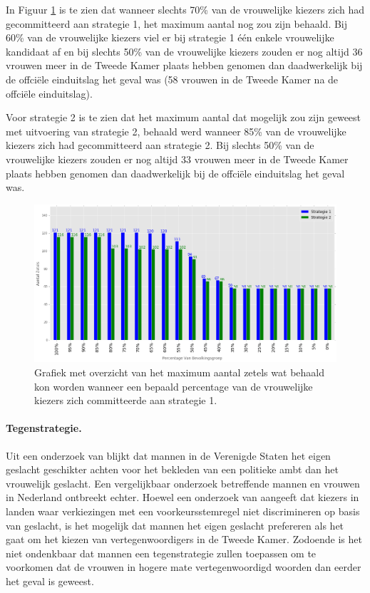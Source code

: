In Figuur \ref{fig:PerV} is te zien dat wanneer slechts 70\% van de vrouwelijke kiezers zich had gecommitteerd aan strategie 1, het maximum aantal nog zou zijn behaald. Bij 60\% van de vrouwelijke kiezers viel er bij strategie 1 één enkele vrouwelijke kandidaat af en bij slechts 50\% van de vrouwelijke kiezers zouden er nog altijd 36 vrouwen meer in de Tweede Kamer plaats hebben genomen dan daadwerkelijk bij de offci\"{e}le einduitslag het geval was (58 vrouwen in de Tweede Kamer na de offci\"{e}le einduitslag). 

Voor strategie 2 is te zien dat het maximum aantal dat mogelijk zou zijn geweest met uitvoering van strategie 2, behaald werd wanneer 85\% van de vrouwelijke kiezers zich had gecommitteerd aan strategie 2. Bij slechts 50\% van de vrouwelijke kiezers zouden er nog altijd 33 vrouwen meer in de Tweede Kamer plaats hebben genomen dan daadwerkelijk bij de offci\"{e}le einduitslag het geval was.

\begin{figure}[H]


	\includegraphics[width=\linewidth]{percentages_van_vrouwenS1S2.png}

			\caption{Grafiek met overzicht van het maximum aantal zetels wat behaald kon worden wanneer een bepaald percentage van de vrouwelijke kiezers zich committeerde aan strategie 1.}

\label{fig:PerV}
\end{figure}






\paragraph{Tegenstrategie.}
Uit een onderzoek van \cite{lawless2012men} blijkt dat mannen in de Verenigde Staten het eigen geslacht geschikter achten voor het bekleden van een politieke ambt dan het vrouwelijk geslacht. Een vergelijkbaar onderzoek betreffende mannen en vrouwen in Nederland ontbreekt echter. Hoewel een onderzoek van \cite{mcelroy2009candidate} aangeeft dat kiezers in landen waar verkiezingen met een voorkeursstemregel niet discrimineren op basis van geslacht, is het mogelijk dat mannen het eigen geslacht prefereren als het gaat om het kiezen van vertegenwoordigers in de Tweede Kamer. Zodoende is het niet ondenkbaar dat mannen een tegenstrategie zullen toepassen om te voorkomen dat de vrouwen in hogere mate vertegenwoordigd woorden dan eerder het geval is geweest. 

